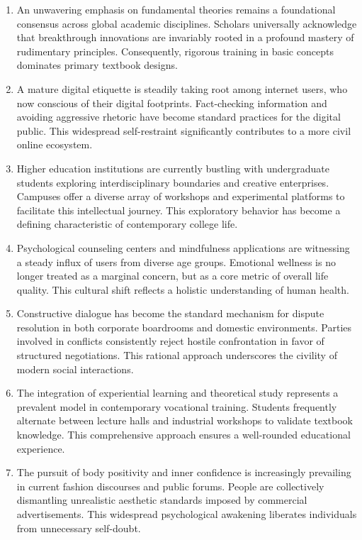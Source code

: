 ﻿\documentclass[lang=cn,11pt]{elegantbook}
\begin{document}
\begin{enumerate}
\item An unwavering emphasis on fundamental theories remains a foundational consensus across global academic disciplines. Scholars universally acknowledge that breakthrough innovations are invariably rooted in a profound mastery of rudimentary principles. Consequently, rigorous training in basic concepts dominates primary textbook designs.
\item A mature digital etiquette is steadily taking root among internet users, who now conscious of their digital footprints. Fact-checking information and avoiding aggressive rhetoric have become standard practices for the digital public. This widespread self-restraint significantly contributes to a more civil online ecosystem. 
\item Higher education institutions are currently bustling with undergraduate students exploring interdisciplinary boundaries and creative enterprises. Campuses offer a diverse array of workshops and experimental platforms to facilitate this intellectual journey. This exploratory behavior has become a defining characteristic of contemporary college life.
\item Psychological counseling centers and mindfulness applications are witnessing a steady influx of users from diverse age groups. Emotional wellness is no longer treated as a marginal concern, but as a core metric of overall life quality. This cultural shift reflects a holistic understanding of human health.
\item Constructive dialogue has become the standard mechanism for dispute resolution in both corporate boardrooms and domestic environments. Parties involved in conflicts consistently reject hostile confrontation in favor of structured negotiations. This rational approach underscores the civility of modern social interactions.
\item The integration of experiential learning and theoretical study represents a prevalent model in contemporary vocational training. Students frequently alternate between lecture halls and industrial workshops to validate textbook knowledge. This comprehensive approach ensures a well-rounded educational experience. 
\item The pursuit of body positivity and inner confidence is increasingly prevailing in current fashion discourses and public forums. People are collectively dismantling unrealistic aesthetic standards imposed by commercial advertisements. This widespread psychological awakening liberates individuals from unnecessary self-doubt.
\end{enumerate} 
\end{document}
